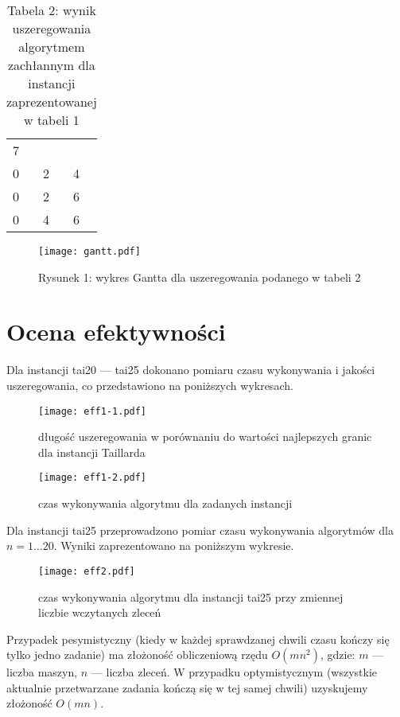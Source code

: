 \documentclass[10pt,a4paper]{article}
\begin{document}
\begin{table}[H]
    \begin{center}
        \begin{tabular}{ l l l }
            7 & &\\
            0 & 2 & 4\\
            0 & 2 & 6\\
            0 & 4 & 6
        \end{tabular}
        \caption*{Tabela 2: wynik uszeregowania algorytmem zachłannym dla instancji zaprezentowanej w tabeli 1}
    \end{center}
\end{table}

\begin{figure}[H]
    \centering
    \texttt{[image: gantt.pdf]}
    \caption*{Rysunek 1: wykres Gantta dla uszeregowania podanego w tabeli 2}
\end{figure}

\section{Ocena efektywności}
Dla instancji tai20 --- tai25 dokonano pomiaru czasu wykonywania i jakości uszeregowania, co przedstawiono na poniższych wykresach.

\begin{figure}[H]
\centering
\texttt{[image: eff1-1.pdf]} 
\caption{długość uszeregowania w porównaniu do wartości najlepszych granic dla instancji Taillarda}
\label{eff11}
\end{figure}

\begin{figure}[H]
    \centering
    \texttt{[image: eff1-2.pdf]}
    \caption{czas wykonywania algorytmu dla zadanych instancji}
    \label{eff12}
\end{figure}

 
Dla instancji tai25 przeprowadzono pomiar czasu wykonywania algorytmów dla $n=1\ldots20$. Wyniki zaprezentowano na poniższym wykresie.

\begin{figure}[H]
    \centering
    \texttt{[image: eff2.pdf]}
    \caption{czas wykonywania algorytmu dla instancji tai25 przy zmiennej liczbie wczytanych zleceń}
\end{figure}

Przypadek pesymistyczny (kiedy w każdej sprawdzanej chwili czasu kończy się tylko jedno zadanie) ma złożoność obliczeniową rzędu $O(mn^2)$, gdzie: $m$ --- liczba maszyn, $n$ --- liczba zleceń. W przypadku optymistycznym (wszystkie aktualnie przetwarzane zadania kończą się w tej samej chwili) uzyskujemy złożoność $O(mn)$. 
    
\end{document}

